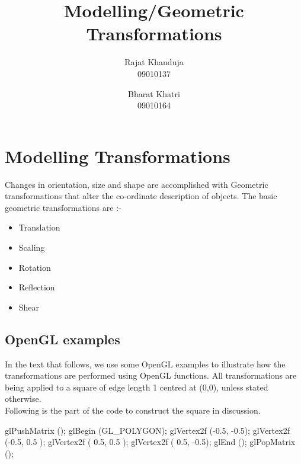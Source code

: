 \documentclass[a4paper,12pt,titlepage,twosided]{article}
\begin{document}
\title{Modelling/Geometric Transformations}

\author{Rajat Khanduja \\
	09010137 \\
	\and
	Bharat Khatri\\
	09010164}
\date{} %

\maketitle

\tableofcontents
\pagebreak

\section{Modelling Transformations}
	Changes in orientation, size and shape are accomplished with Geometric transformations that alter the co-ordinate description of objects. The basic geometric transformations are :- \\
	\begin{itemize}
		\item Translation
		\item Scaling
		\item Rotation
		\item Reflection
		\item Shear
	\end{itemize}

	\subsection{OpenGL examples}
	In the text that follows, we use some OpenGL examples to illustrate how the transformations are performed using OpenGL functions. All transformations are being applied to a square of edge length 1 centred at (0,0), unless stated otherwise. 	
\\
	Following is the part of the code to construct the square in discussion. 
	\begin{code}
		glPushMatrix ();
		glBegin (GL_POLYGON);
		glVertex2f (-0.5, -0.5);
		glVertex2f (-0.5, 0.5 );
		glVertex2f ( 0.5, 0.5 );
		glVertex2f ( 0.5, -0.5);
		glEnd ();
		glPopMatrix ();
	\end{code}
	
\end{document}
